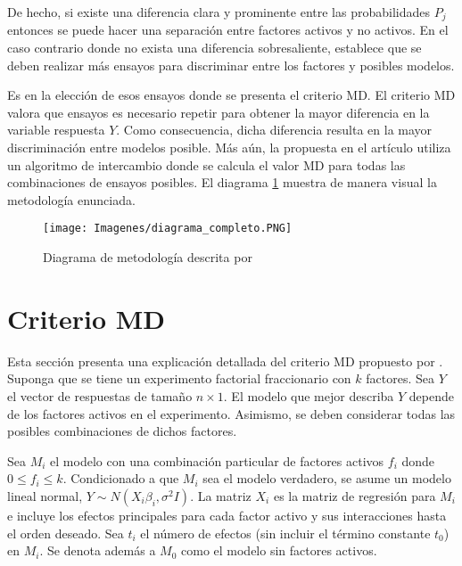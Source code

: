 De hecho, si existe una diferencia clara y prominente entre las probabilidades $P_j$ entonces se puede hacer una separación entre factores activos y no activos. En el caso contrario donde no exista una diferencia sobresaliente, \cite{meyer1996} establece que se deben realizar más ensayos para discriminar entre los factores y posibles modelos. 

Es en la elección de esos ensayos donde se presenta el criterio MD. El criterio MD valora que ensayos es necesario repetir para obtener la mayor diferencia en la variable respuesta $Y$. Como consecuencia, dicha diferencia resulta en la mayor discriminación entre modelos posible. Más aún, la propuesta en el artículo \cite{meyer1996} utiliza un algoritmo de intercambio donde se calcula el valor MD para todas las combinaciones de ensayos posibles. El diagrama \ref{diagrama_completo} muestra de manera visual la metodología enunciada. 

\begin{figure}[h]
	\begin{center}
		\texttt{[image: Imagenes/diagrama\_completo.PNG]}
		\caption{Diagrama de metodología descrita por \cite{meyer1996}}
		\label{diagrama_completo}
	\end{center}
\end{figure} 



\section{Criterio MD} \label{seccion_criterioMD}
Esta sección presenta una explicación detallada del criterio MD propuesto por \cite{meyer1996}. Suponga que se tiene un experimento factorial fraccionario con $k$ factores. Sea \textbf{$Y$} el vector de respuestas de tamaño $n \times 1$. El modelo que mejor describa \textbf{$Y$} depende de los factores activos en el experimento. Asimismo, se deben considerar todas las posibles combinaciones de dichos factores. 

Sea $M_i$ el modelo con una combinación particular de factores activos $f_i$ donde $0 \leq f_i \leq k$. Condicionado a que $M_i$ sea el modelo verdadero, se asume un modelo lineal normal, $\textbf{$Y$} \sim N(X_i \beta_i, \sigma^2 I).$ La matriz $X_i$ es la matriz de regresión para $M_i$ e incluye los efectos principales para cada factor activo y sus interacciones hasta el orden deseado. Sea $t_i$ el número de efectos (sin incluir el término constante $t_0$) en $M_i$. Se denota además a $M_0$ como el modelo sin factores activos. 

